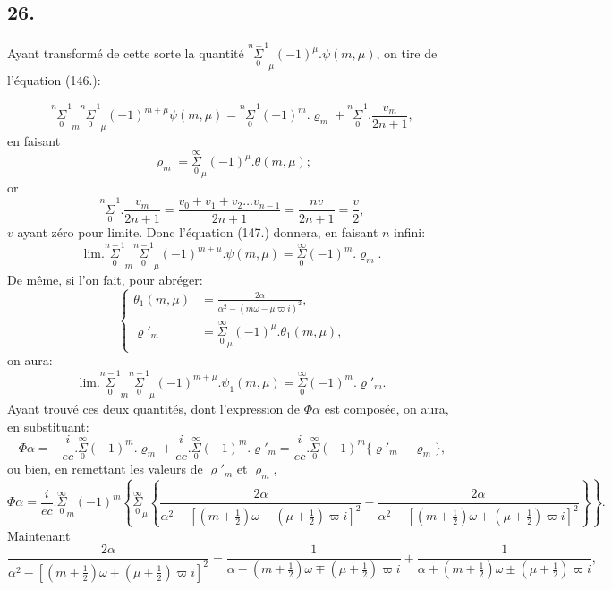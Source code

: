 \documentclass{article}
\begin{document}
\subsection*{26.}

Ayant transformé de cette sorte la quantité $\overset{n-1}{\underset{0}{\Sigma}}_{\mu}(-1)^{\mu}.\psi(m,\mu)$, on tire de l'équation (146.):

\[ \overset{n-1}{\underset{0}{\Sigma}}_{m}\overset{n-1}{\underset{0}{\Sigma}}_{\mu}(-1)^{m+\mu}\psi(m,\mu)=\overset{n-1}{\underset{0}{\Sigma}}(-1)^{m}.\varrho_{m}+\overset{n-1}{\underset{0}{\Sigma}}.\frac{v_{m}}{2n+1}, \tag{147.} \]
en faisant
\[ \varrho_{m}=\overset{\infty}{\underset{0}{\Sigma}}_{\mu}(-1)^{\mu}.\theta(m,\mu); \tag{148.} \]
or
\[ \overset{n-1}{\underset{0}{\Sigma}}.\frac{v_{m}}{2n+1}=\frac{v_{0}+v_{1}+v_{2}\ldots v_{n-1}}{2n+1}=\frac{nv}{2n+1}=\frac{v}{2}, \]
$v$ ayant zéro pour limite. Donc l'équation (147.) donnera, en faisant $n$ infini:
\[ \text{lim.}\overset{n-1}{\underset{0}{\Sigma}}_{m}\overset{n-1}{\underset{0}{\Sigma}}_{\mu}(-1)^{m+\mu}.\psi(m,\mu)=\overset{\infty}{\underset{0}{\Sigma}}(-1)^{m}.\varrho_{m}. \tag{149.} \]
De même, si l'on fait, pour abréger:
\[ \left\{\begin{aligned}\theta_{1}(m,\mu)&=\frac{2\alpha}{\alpha^{2}-(m\omega-\mu\varpi i)^{2}},\\ \varrho'_{m}&=\overset{\infty}{\underset{0}{\Sigma}}_{\mu}(-1)^{\mu}.\theta_{1}(m,\mu),\end{aligned}\right. \tag{150.} \]
on aura:
\[ \text{lim.}\overset{n-1}{\underset{0}{\Sigma}}_{m}\overset{n-1}{\underset{0}{\Sigma}}_{\mu}(-1)^{m+\mu}.\psi_{1}(m,\mu)=\overset{\infty}{\underset{0}{\Sigma}}(-1)^{m}.\varrho'_{m}. \tag{151.} \]
Ayant trouvé ces deux quantités, dont l'expression de $\Phi\alpha$ est composée, on aura, en substituant:
\[ \Phi\alpha=-\frac{i}{ec}.\overset{\infty}{\underset{0}{\Sigma}}(-1)^{m}.\varrho_{m}+\frac{i}{ec}.\overset{\infty}{\underset{0}{\Sigma}}(-1)^{m}.\varrho'_{m}=\frac{i}{ec}.\overset{\infty}{\underset{0}{\Sigma}}(-1)^{m}\{\varrho'_{m}-\varrho_{m}\}, \]
ou bien, en remettant les valeurs de $\varrho'_{m}$ et $\varrho_{m}$,
\[ \Phi\alpha=\frac{i}{ec}.\overset{\infty}{\underset{0}{\Sigma}}_{m}(-1)^{m}\left\{\overset{\infty}{\underset{0}{\Sigma}}_{\mu}\left\{\frac{2\alpha}{\alpha^{2}-[(m+\tfrac{1}{2})\omega-(\mu+\tfrac{1}{2})\varpi i]^{2}}-\frac{2\alpha}{\alpha^{2}-[(m+\tfrac{1}{2})\omega+(\mu+\tfrac{1}{2})\varpi i]^{2}}\right\}\right\}. \tag{152.} \]
Maintenant
\[ \frac{2\alpha}{\alpha^{2}-[(m+\tfrac{1}{2})\omega\pm(\mu+\tfrac{1}{2})\varpi i]^{2}}=\frac{1}{\alpha-(m+\tfrac{1}{2})\omega\mp(\mu+\tfrac{1}{2})\varpi i}+\frac{1}{\alpha+(m+\tfrac{1}{2})\omega\pm(\mu+\tfrac{1}{2})\varpi i}, \]
\end{document}
